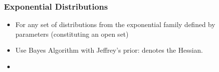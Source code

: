 \documentclass[handout]{beamer}
\begin{document}
\begin{frame}
\frametitle{Exponential Distributions}
\begin{itemize}
\item For any set of distributions from the exponential family
  defined by  parameters (constituting an open set) \B{[Rissanen96]}
\item Use Bayes Algorithm with Jeffrey's prior:
\R{\[
\dweight{\btheta}{*} = \frac{1}{Z} 
\frac{1}{\sqrt{
\left| \left. {\mathbf H} \paren{D_{KL} (\btheta || \theta) } \right|_{\theta=\btheta} \right|
}}
\]}
 denotes the Hessian.
\item
{}
\end{itemize}
\end{frame}
\end{document}
